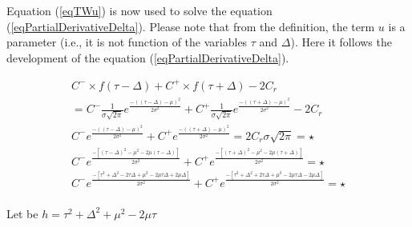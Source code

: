 Equation (\ref{eqTWu}) is now used to solve the equation (\ref{eqPartialDerivativeDelta}). Please note that from the definition, the term $u$ is a parameter (i.e., it is not function of the variables $\tau$ and $\Delta$). Here it follows the development of the equation (\ref{eqPartialDerivativeDelta}).

\begin{equation}
    \begin{split}
        C^-\times f(\tau-\Delta)+C^+ \times f(\tau+\Delta)-2C_r \\= C^{-}\frac{1}{\sigma\sqrt{2\pi}}e^{\frac{-((\tau-\Delta)-\mu)^2}{2\sigma^2}} + C^{+}\frac{1}{\sigma\sqrt{2\pi}}e^{\frac{-((\tau+\Delta)-\mu)^2}{2\sigma^2}} - 2C_r\\
        C^{-}e^{\frac{-((\tau-\Delta)-\mu)^2}{2\sigma^2}} + C^{+}e^{\frac{-((\tau+\Delta)-\mu)^2}{2\sigma^2}} = 2C_r\sigma\sqrt{2\pi} = \star \\
        C^{-}e^{\frac{-[(\tau-\Delta)^2-\mu^2 -2\mu(\tau-\Delta)]}{2\sigma^2}} + C^{+}e^{\frac{-[(\tau+\Delta)^2-\mu^2 -2\mu(\tau+\Delta)]}{2\sigma^2}} = \star\\
        C^{-}e^{\frac{-[\tau^2+\Delta^2-2\tau\Delta +\mu^2 -2\mu\tau\Delta + 2\mu\Delta]}{2\sigma^2}} + C^{+}e^{\frac{-[\tau^2+\Delta^2+2\tau\Delta +\mu^2 -2\mu\tau\Delta - 2\mu\Delta]}{2\sigma^2}} = \star\\
    \end{split}
\end{equation}

Let be $h=\tau^2+\Delta^2+\mu^2-2\mu\tau$

